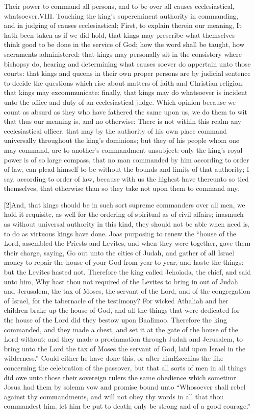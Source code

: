 Their power to command all persons, and to be over all causes ecclesiastical, whatsoever.VIII. Touching the king’s supereminent authority in commanding, and in judging of causes ecclesiastical; First, to explain therein our meaning, It hath been taken as if we did hold, that kings may prescribe what themselves think good to be done in the service of God; how the word shall be taught, how sacraments administered: that kings may personally sit in the consistory where bishopsy do, hearing and determining what causes soever do appertain unto those courts: that kings and queens in their own proper persons are by judicial sentence to decide the questions which rise about matters of faith and Christian religion: that kings may excommunicate: finally, that kings may do whatsoever is incident unto the office and duty of an ecclesiastical judge. Which opinion because we count as absurd as they who have fathered the same upon us, we do them to wit that thus our meaning is, and no otherwise: There is not within this realm any ecclesiastical officer, that may by the authority of his own place command universally throughout the king’s dominions; but they of his people whom one may command, are to another’s commandment unsubject: only the king’s royal power is of so large compass, that no man commanded by him according to order of law, can plead himself to be without the bounds and limits of that authority; I say, according to order of law, because with us the highest have thereunto so tied themselves, that otherwise than so they take not upon them to command any.

[2]And, that kings should be in such sort supreme commanders over all men, we hold it requisite, as well for the  ordering of spiritual as of civil affairs; inasmuch as without universal authority in this kind, they should not be able when need is, to do as virtuous kings have done. Joas purposing to renew the “house of the Lord, assembled the Priests and Levites, and when they were together, gave them their charge, saying, Go out unto the cities of Judah, and gather of all Israel money to repair the house of your God from year to year, and haste the things: but the Levites hasted not. Therefore the king called Jehoiada, the chief, and said unto him, Why hast thou not required of the Levites to bring in out of Judah and Jerusalem, the tax of Moses, the servant of the Lord, and of the congregation of Israel, for the tabernacle of the testimony? For wicked Athaliah and her children brake up the house of God, and all the things that were dedicated for the house of the Lord did they bestow upon Baalimoo. Therefore the king commanded, and they made a chest, and set it at the gate of the house of the Lord without; and they made a proclamation through Judah and Jerusalem, to bring unto the Lord the tax of Moses the servant of God, laid upon Israel in the wilderness.” Could either he have done this, or after himEzechias the like concerning the celebration of the passover, but that all sorts of men in all things did owe unto those their sovereign rulers the same obedience which sometimr Josua had them by solemn vow and promise bound unto “Whosoever shall rebel against thy commandments, and will not obey thy words in all that thou commandest him, let him be put to death; only be strong and of a good courage.”

